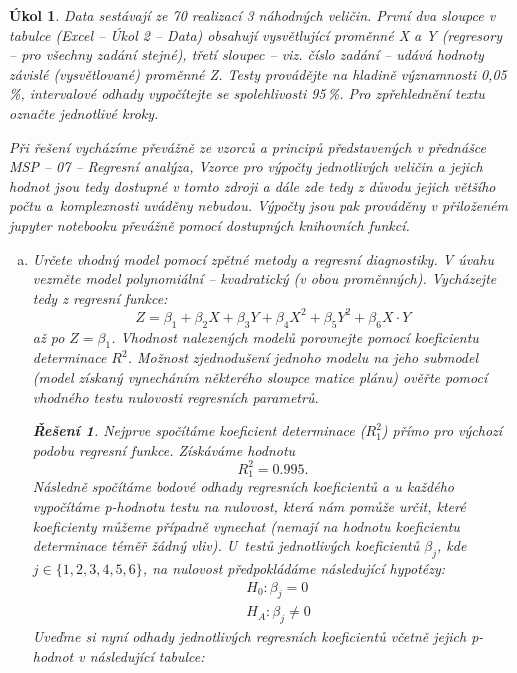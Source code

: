 \documentclass[11pt, a4paper]{article}
\theoremstyle{result}
\newtheorem*{result}{Řešení}
\newtheorem{task}{Úkol}
\begin{document}
\begin{task}
    Data sestávají ze 70 realizací 3 náhodných veličin. První dva sloupce v tabulce (Excel -- Úkol 2 -- Data) obsahují vysvětlující proměnné X a Y (regresory -- pro všechny zadání stejné), třetí sloupec -- viz. číslo zadání -- udává hodnoty závislé (vysvětlované) proměnné Z. Testy provádějte na hladině významnosti 0,05\,\%, intervalové odhady vypočítejte se spolehlivosti 95\,\%. Pro zpřehlednění textu označte jednotlivé kroky.

    Při řešení vycházíme převážně ze vzorců a principů představených v přednášce MSP -- 07 -- Regresní analýza, Vzorce pro výpočty jednotlivých veličin a jejich hodnot jsou tedy dostupné v tomto zdroji a dále zde tedy z důvodu jejich většího počtu a~komplexnosti uváděny nebudou. Výpočty jsou pak prováděny v přiloženém jupyter notebooku převážně pomocí dostupných knihovních funkcí. 

    \begin{enumerate}[a)]
        \item Určete vhodný model pomocí zpětné metody a regresní diagnostiky. V úvahu vezměte model polynomiální – kvadratický (v obou proměnných). Vycházejte tedy z regresní funkce:
        $$Z = \beta_1 + \beta_2X + \beta_3 Y + \beta_4 X^2 + \beta_5 Y^2 + \beta_6 X \cdot Y$$
        až po $Z = \beta_1$.
        Vhodnost nalezených modelů porovnejte pomocí koeficientu determinace $R^2$. Možnost zjednodušení jednoho modelu na jeho submodel (model získaný vynecháním některého sloupce matice plánu) ověřte pomocí vhodného testu nulovosti regresních parametrů.

        \begin{result}
            Nejprve spočítáme koeficient determinace ($R^2_1$) přímo pro výchozí podobu regresní funkce. Získáváme hodnotu
            $$R^2_1 = 0.995.$$
            Následně spočítáme bodové odhady regresních koeficientů a u každého vypočítáme \textit{p-hodnotu} testu na nulovost, která nám pomůže určit, které koeficienty můžeme případně vynechat (nemají na hodnotu koeficientu determinace téměř žádný vliv). U~testů jednotlivých koeficientů $\beta_j$, kde $j \in \{1, 2, 3, 4, 5, 6\}$, na nulovost předpokládáme následující hypotézy:
            \begin{align*}
                &H_0: \beta_j = 0 \\
                &H_A: \beta_j \neq 0
            \end{align*}
            Uveďme si nyní odhady jednotlivých regresních koeficientů včetně jejich \textit{p-hodnot} v následující tabulce:


\end{result}
\end{enumerate}
\end{task}
\end{document}
